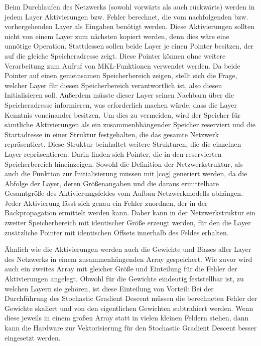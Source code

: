 \documentclass[../main.tex]{subfiles}
\begin{document}
Beim Durchlaufen des Netzwerks (sowohl vorwärts als auch rückwärts) werden in jedem Layer Aktivierungen bzw. Fehler berechnet, die vom nachfolgenden bzw. vorhergehenden Layer als Eingaben benötigt werden. Diese Aktivierungen sollten nicht von einem Layer zum nächsten kopiert werden, denn dies wäre eine unnötige Operation. Stattdessen sollen beide Layer je einen Pointer besitzen, der auf die gleiche Speicheradresse zeigt. Diese Pointer können ohne weitere Verarbeitung zum Aufruf von MKL-Funktionen verwendet werden. Da beide Pointer auf einen gemeinsamen Speicherbereich zeigen, stellt sich die Frage, welcher Layer für diesen Speicherbereich verantwortlich ist, also diesen Initialisieren soll. Außerdem müsste dieser Layer seinen Nachbarn über die Speicheradresse informieren, was erforderlich machen würde, dass die Layer Kenntnis voneinander besitzen. Um dies zu vermeiden, wird der Speicher für sämtliche Aktivierungen als ein zusammenhhängender Speicher reserviert und die Startadresse in einer Struktur festgehalten, die das gesamte Netzwerk repräsentiert. Diese Struktur beinhaltet weitere Strukturen, die die einzelnen Layer repräsentieren. Darin finden sich Pointer, die in den reservierten Speicherbereich hineinzeigen. Sowohl die Definition der Netzwerkstruktur, als auch die Funktion zur Initialisierung müssen mit |cog| generiert werden, da die Abfolge der Layer, deren Größenangaben und die daraus ermittelbare Gesamtgröße des Aktivierungsfeldes vom Aufbau Netzwerkmodells abhängen. Jeder Aktivierung lässt sich genau ein Fehler zuordnen, der in der Backpropagation ermittelt werden kann. Daher kann in der Netzwerkstruktur ein zweiter Speicherbereich mit identischer Größe erzeugt werden, für den die Layer zusätzliche Pointer mit identischen Offsets innerhalb des Feldes erhalten. 

Ähnlich wie die Aktivierungen werden auch die Gewichte und Biases aller Layer des Netzwerks in einem zusammenhängenden Array gespeichert. Wie zuvor wird auch ein zweites Array mit gleicher Größe und Einteilung für die Fehler der Aktivierungen angelegt. Obwohl für die Gewichte eindeutig feststellbar ist, zu welchen Layern sie gehören, ist diese Einteilung von Vorteil: Bei der Durchführung des Stochastic Gradient Descent müssen die berechneten Fehler der Gewichte skaliert und von den eigentlichen Gewichten subtrahiert werden. Wenn diese jeweils in einem großen Array statt in vielen kleinen Feldern stehen, dann kann die Hardware zur Vektorisierung für den Stochastic Gradient Descent besser eingesetzt werden. 
\end{document}
